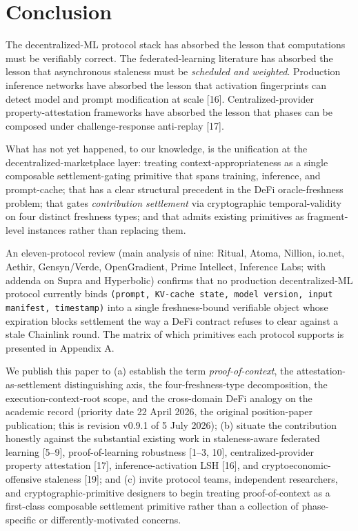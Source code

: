 \documentclass[11pt]{article}
\begin{document}
\section{Conclusion}

The decentralized-ML protocol stack has absorbed the lesson that computations must be verifiably correct. The federated-learning literature has absorbed the lesson that asynchronous staleness must be \emph{scheduled and weighted}. Production inference networks have absorbed the lesson that activation fingerprints can detect model and prompt modification at scale [16]. Centralized-provider property-attestation frameworks have absorbed the lesson that phases can be composed under challenge-response anti-replay [17].

What has not yet happened, to our knowledge, is the unification at the decentralized-marketplace layer: treating context-appropriateness as a single composable settlement-gating primitive that spans training, inference, and prompt-cache; that has a clear structural precedent in the DeFi oracle-freshness problem; that gates \emph{contribution settlement} via cryptographic temporal-validity on four distinct freshness types; and that admits existing primitives as fragment-level instances rather than replacing them.

An eleven-protocol review (main analysis of nine: Ritual, Atoma, Nillion, io.net, Aethir, Gensyn/Verde, OpenGradient, Prime Intellect, Inference Labs; with addenda on Supra and Hyperbolic) confirms that no production decentralized-ML protocol currently binds \texttt{(prompt, KV-cache state, model version, input manifest, timestamp)} into a single freshness-bound verifiable object whose expiration blocks settlement the way a DeFi contract refuses to clear against a stale Chainlink round. The matrix of which primitives each protocol supports is presented in Appendix A.

We publish this paper to (a) establish the term \emph{proof-of-context}, the attestation-as-settlement distinguishing axis, the four-freshness-type decomposition, the execution-context-root scope, and the cross-domain DeFi analogy on the academic record (priority date 22 April 2026, the original position-paper publication; this is revision v0.9.1 of 5 July 2026); (b) situate the contribution honestly against the substantial existing work in staleness-aware federated learning [5--9], proof-of-learning robustness [1--3, 10], centralized-provider property attestation [17], inference-activation LSH [16], and cryptoeconomic-offensive staleness [19]; and (c) invite protocol teams, independent researchers, and cryptographic-primitive designers to begin treating proof-of-context as a first-class composable settlement primitive rather than a collection of phase-specific or differently-motivated concerns.
\end{document}
